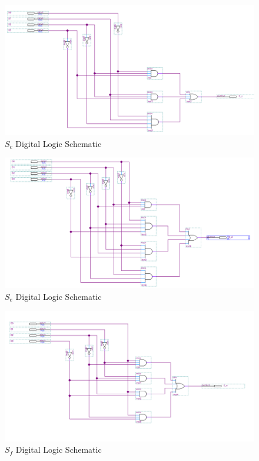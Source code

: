 \documentclass{article}
\begin{document}
\begin{figure}[H]
  \centering
  \includegraphics[width=1\textwidth]{S_c_schem.png}
  \caption{$S_c$ Digital Logic Schematic}
\end{figure}

\begin{figure}[H]
  \centering
  \includegraphics[width=1\textwidth]{S_d_schem.png}
  \caption{$S_e$ Digital Logic Schematic}
\end{figure}

\begin{figure}[H]
  \centering
  \includegraphics[width=1\textwidth]{S_e_schem.png}
  \caption{$S_f$ Digital Logic Schematic}
\end{figure}
\end{document}
